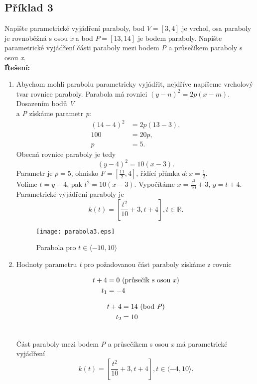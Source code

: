 		\subsection*{Příklad 3}
		Napište parametrické vyjádření paraboly, bod $V=[3,4]$ je vrchol, osa paraboly je rovnoběžná s osou \textit{x} a bod $P=[13,14]$ je bodem paraboly.
		Napište parametrické vyjádření části paraboly mezi bodem \textit{P} a průsečíkem paraboly s osou \textit{x}. \\[5pt]
		\textbf{Řešení:}
		\noindent\begin{enumerate}
		\item Abychom mohli parabolu parametricky vyjádřit, nejdříve napíšeme vrcholový tvar rovnice paraboly.
		Parabola má rovnici $(y-n)^2=2p(x-m)$.
		Dosazením bodů \textit{V}\\ a \textit{P} získáme parametr \textit{p}:
		\begin{align*}
			(14-4)^2 & = 2p(13-3), \\
			100      & = 20p,      \\
			p        & = 5.        
		\end{align*}
		Obecná rovnice paraboly je tedy
		$$(y-4)^2=10(x-3).$$
		Parametr je $p=5$, ohnisko $F=\left[\frac{11}{2},4\right]$,  řídící přímka $d: x=\frac{1}{2}$.\\
		Volíme $t=y-4$, pak $t^2=10(x-3)$. Vypočítáme $x=\frac{t^2}{10}+3$, $y=t+4$.\\
		Parametrické vyjádření paraboly je
		$$k(t) = \left[\frac{t^2}{10}+3, t+4\right], t \in \mathbb{R}.$$
		\vfill
		\begin{figure}[H]
			\centering
			\texttt{[image: parabola3.eps]}
			\caption{Parabola pro $t \in \langle-10, 10\rangle$}
								
		\end{figure}
		\item
		Hodnoty parametru \textit{t} pro požadovanou část paraboly získáme z rovnic		
									
		\noindent\begin{minipage}[t]{0.5\textwidth}
		\begin{align*}
			t + 4 & = 0 \text{ (průsečík s osou \textit{x})} \\
			t_1   & = -4                                        
		\end{align*}
		\end{minipage}
		\noindent\begin{minipage}[t]{0.5\textwidth}
		\begin{align*}
			t + 4 & = 14 \text{ (bod \textit{P})} \\
			t_2   & = 10                          
		\end{align*}
		\end{minipage}
		\\[10pt]
		Část paraboly mezi bodem \textit{P} a průsečíkem s osou \textit{x} má parametrické vyjádření
		$$k(t) = \left[\frac{t^2}{10}+3, t+4\right], t \in \langle-4, 10\rangle.$$
		\end{enumerate}
